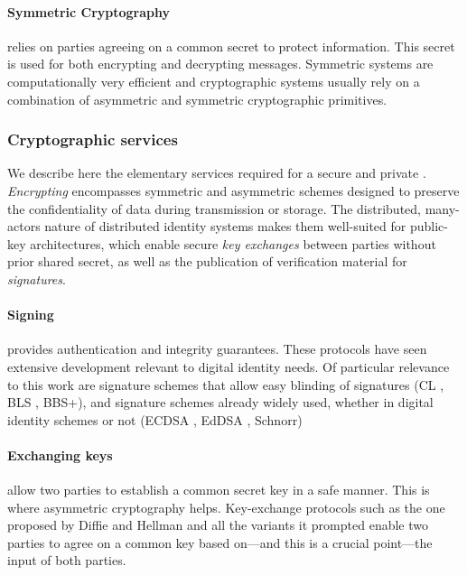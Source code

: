 \paragraph{Symmetric Cryptography} relies on parties agreeing on a common secret to protect information. This secret is used for both encrypting and decrypting messages. Symmetric systems are computationally very efficient and cryptographic systems usually rely on a combination of asymmetric and symmetric cryptographic primitives.

\subsubsection{Cryptographic services} 
\label{pa:cryptographic-services}

We describe here the elementary services required for a secure and private \eid. \emph{Encrypting} encompasses symmetric and asymmetric schemes designed to preserve the confidentiality of data during transmission or storage. The distributed, many-actors nature of distributed identity systems makes them well-suited for public-key architectures, which enable secure \emph{key exchanges} between parties without prior shared secret, as well as the publication of verification material for \emph{signatures}.

\paragraph{Signing} 
\label{sp:signing}
provides authentication and integrity guarantees.
These protocols have seen extensive development relevant to digital identity needs. 
Of particular relevance to this work are signature schemes that allow easy blinding of signatures (CL \cite{CL02}, BLS \cite{BLS01}, BBS+\cite{ASM06}), and signature schemes already widely used, whether in digital identity schemes or not (ECDSA \cite{NIST186-5}, EdDSA \cite{BDLSY11}, Schnorr)

\paragraph{Exchanging keys} allow two parties to establish a common secret key in a safe manner.
\label{sp:exchanging-keys}
This is where asymmetric cryptography helps. Key-exchange protocols such as the one proposed by Diffie and Hellman \cite{DH76} and all the variants it prompted enable two parties to agree on a common key based on---and this is a crucial point---the input of both parties.

